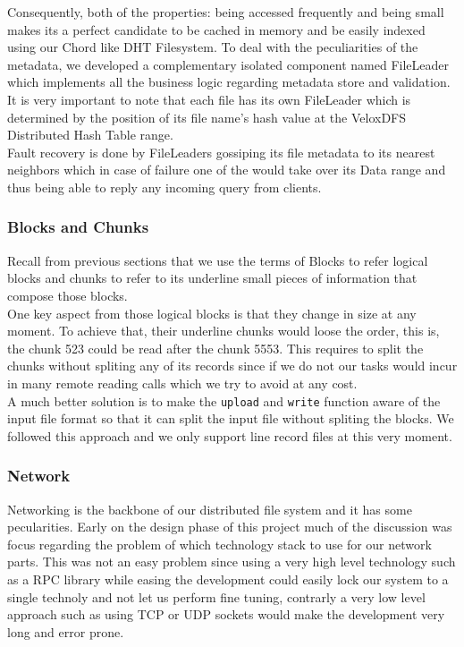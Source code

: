 Consequently, both of the properties: being accessed frequently and being small makes its a perfect candidate to be cached in memory and be easily indexed using our Chord like DHT Filesystem. To deal with the peculiarities of the metadata, we developed a complementary isolated component named FileLeader which implements all the business logic regarding metadata store and validation. It is very important to note that each file has its own FileLeader which is determined by the position of its file name's hash value at the VeloxDFS Distributed Hash Table range. \\

Fault recovery is done by FileLeaders gossiping its file metadata to its nearest neighbors which in case of failure one of the would take over its Data range and thus being able to reply any incoming query from clients. 

\subsubsection{Blocks and Chunks}
Recall from previous sections that we use the terms of Blocks to refer logical blocks and chunks to refer to its underline small pieces of information that compose those blocks. \\
One key aspect from those logical blocks is that they change in size at any moment. To achieve that, 
their underline chunks would loose the order, this is, the chunk 523 could be read after the chunk 5553. This requires to split the chunks without spliting any of its records since if we do not our tasks would incur in many remote reading calls which we try to avoid at any cost. \\
A much better solution is to make the \texttt{upload} and \texttt{write} function aware of the input file format so that it can split the input file without spliting the blocks. We followed this approach and we only support line record files at this very moment.


\subsubsection{Network}
Networking is the backbone of our distributed file system and it has some pecularities. Early on the
design phase of this project much of the discussion was focus regarding the problem of which technology stack to use for our network parts. This was not an easy problem since using a very high level technology such as a RPC library while easing the development could easily lock our system to a single technoly and not let us perform fine tuning, contrarly a very low level approach such as using TCP or UDP sockets would make the development very long and error prone. \\

